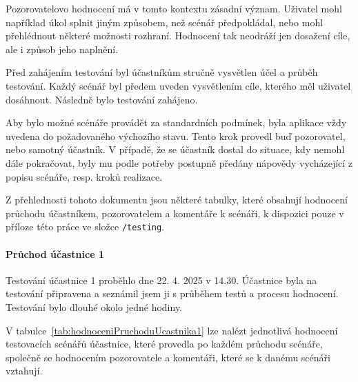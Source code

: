 Pozorovatelovo hodnocení má v tomto kontextu zásadní význam. 
Uživatel mohl například úkol splnit jiným způsobem, než scénář předpokládal, nebo mohl přehlédnout některé možnosti rozhraní. 
Hodnocení tak neodráží jen dosažení cíle, ale i způsob jeho naplnění.

Před zahájením testování byl účastníkům stručně vysvětlen účel a průběh testování. 
Každý scénář byl předem uveden vysvětlením cíle, kterého měl uživatel dosáhnout. 
Následně bylo testování zahájeno.

Aby bylo možné scénáře provádět za standardních podmínek, byla aplikace vždy uvedena do požadovaného výchozího stavu. 
Tento krok provedl buď pozorovatel, nebo samotný účastník. 
V případě, že se účastník dostal do situace, kdy nemohl dále pokračovat, byly mu podle potřeby postupně předány nápovědy vycházející z popisu scénáře, resp. kroků realizace.

Z přehlednosti tohoto dokumentu jsou některé tabulky, které obsahují hodnocení průchodu účastníkem, pozorovatelem a komentáře k scénáři, k dispozici pouze v příloze této práce ve složce \verb|/testing|.

\paragraph{Průchod účastnice 1}

Testování účastnice 1 proběhlo dne 22. 4. 2025 v 14.30. 
Účastnice byla na testování připravena a seznámil jsem ji s průběhem testů a procesu hodnocení. 
Testování bylo dlouhé okolo jedné hodiny.

V tabulce~\ref{tab:hodnoceniPruchoduUcastnika1} lze nalézt jednotlivá hodnocení testovacích scénářů účastnice, které provedla po každém průchodu scénáře, společně se hodnocením pozorovatele a komentáři, které se k danému scénáři vztahují.

